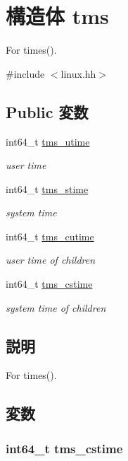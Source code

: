 \hypertarget{structLinux_1_1tms}{
\section{構造体 tms}
\label{structLinux_1_1tms}
}


For times().  


{\ttfamily \#include $<$linux.hh$>$}\subsection*{Public 変数}
\begin{DoxyCompactItemize}
\item 
int64\_\-t \hyperlink{structLinux_1_1tms_ab04ac3ffd1b9aab37d4a7857e0ffcdb8}{tms\_\-utime}
\begin{DoxyCompactList}\small\item\em user time \item\end{DoxyCompactList}\item 
int64\_\-t \hyperlink{structLinux_1_1tms_a35539e36d7debbc4664f2470764bbad0}{tms\_\-stime}
\begin{DoxyCompactList}\small\item\em system time \item\end{DoxyCompactList}\item 
int64\_\-t \hyperlink{structLinux_1_1tms_a6da7d6e7d686aa5a9bf91b8bf6c4139f}{tms\_\-cutime}
\begin{DoxyCompactList}\small\item\em user time of children \item\end{DoxyCompactList}\item 
int64\_\-t \hyperlink{structLinux_1_1tms_ad28846c008175f5be865cdfc14721139}{tms\_\-cstime}
\begin{DoxyCompactList}\small\item\em system time of children \item\end{DoxyCompactList}\end{DoxyCompactItemize}


\subsection{説明}
For times(). 

\subsection{変数}
\hypertarget{structLinux_1_1tms_ad28846c008175f5be865cdfc14721139}{
\subsubsection[{tms\_\-cstime}]{\setlength{\rightskip}{0pt plus 5cm}int64\_\-t {\bf tms\_\-cstime}}}
\label{structLinux_1_1tms_ad28846c008175f5be865cdfc14721139}


